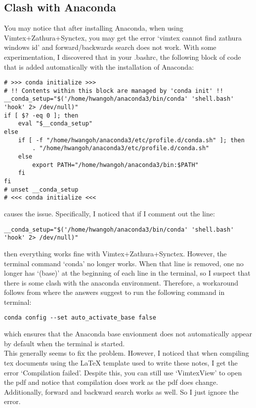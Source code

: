 \subsection{Clash with Anaconda}
You may notice that after installing Anaconda, when using
Vimtex+Zathura+Synctex, you may get the error `vimtex cannot find zathura
windows id' and forward/backwards search does not work. With some
experimentation, I discovered that in your .bashrc, the following block of code
that is added automatically with the installation of Anaconda:
\begin{lstlisting}
# >>> conda initialize >>>
# !! Contents within this block are managed by 'conda init' !!
__conda_setup="$('/home/hwangoh/anaconda3/bin/conda' 'shell.bash' 'hook' 2> /dev/null)"
if [ $? -eq 0 ]; then
    eval "$__conda_setup"
else
    if [ -f "/home/hwangoh/anaconda3/etc/profile.d/conda.sh" ]; then
        . "/home/hwangoh/anaconda3/etc/profile.d/conda.sh"
    else
        export PATH="/home/hwangoh/anaconda3/bin:$PATH"
    fi
fi
# unset __conda_setup
# <<< conda initialize <<<
\end{lstlisting}
causes the issue. Specifically, I noticed that if I comment out the line:
\begin{lstlisting}
__conda_setup="$('/home/hwangoh/anaconda3/bin/conda' 'shell.bash' 'hook' 2> /dev/null)"
\end{lstlisting}
then everything works fine with Vimtex+Zathura+Synctex. However, the terminal
command `conda' no longer works. When that line is removed, one no longer has
`(base)' at the beginning of each line in the terminal, so I suspect that there
is some clash with the anaconda environment. Therefore, a workaround follows
from \cite{drylabrebel2019how} where the answers suggest to run the
following command in terminal:
\begin{lstlisting}
conda config --set auto_activate_base false
\end{lstlisting}
which ensures that the Anaconda base envionment does not automatically appear by
default when the terminal is started.\\

This generally seems to fix the problem. However, I noticed that when compiling
tex documents using the LaTeX template used to write these notes, I get the
error `Compilation failed'. Despite this, you can still use `VimtexView' to open the
pdf and notice that compilation does work as the pdf does change. Additionally,
forward and backward search works as well. So I just ignore the error.


